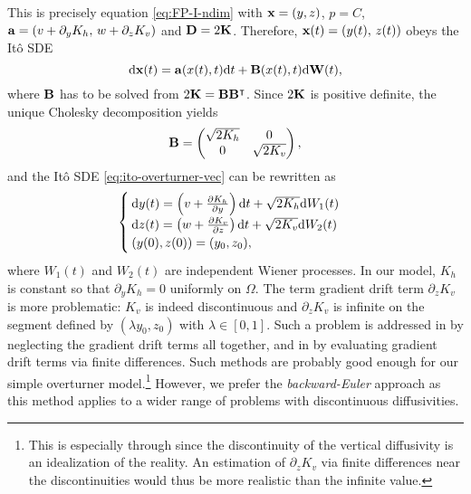 This is precisely equation \eqref{eq:FP-I-ndim} with $\b x =(y,z)$, $p=C$, $\b a = (v+\partial_y K_{h},\, w+\partial_z K_{v})$ and $\b D = 2\b K$. Therefore, $\b x(t) = (y(t),\, z(t))$ obeys the Itô SDE
\begin{equation} \label{eq:ito-overturner-vec}
	\rm d \b x(t) = \b a(x(t),t) \rm dt + \b B(x(t),t) \rm d \b W(t),
\end{equation}
where $\b B$ has to be solved from $2\b K = \b B \b B^{\t}$. Since $2\b K$ is positive definite, the unique Cholesky decomposition yields
\begin{equation} \label{eq:B}
	\b B = \begin{pmatrix} \sqrt{2K_{h}} & 0 \\ 0 & \sqrt{2K_{v}} \end{pmatrix},
\end{equation}
and the Itô SDE \eqref{eq:ito-overturner-vec} can be rewritten as
\begin{equation} \label{eq:ito-overturner}
	\begin{cases}
		\rm dy(t) = \left(v + \frac{\partial K_h}{\partial y} \right) \rm dt + \sqrt{2K_h}\rm dW_1(t)\\
		\rm dz(t) = \left(w + \frac{\partial K_v}{\partial z} \right) \rm dt + \sqrt{2K_v}\rm dW_2(t)\\
		(y(0),z(0)) = (y_0,z_0),
	\end{cases}
\end{equation}
where $W_1(t)$ and $W_2(t)$ are independent Wiener processes. In our model, $K_h$ is constant so that $\partial_y K_h = 0$ uniformly on $\Omega$. The term gradient drift term $\partial_z K_v$ is more problematic: $K_v$ is indeed discontinuous and $\partial_z K_v$ is infinite on the segment defined by $(\lambda y_0, z_0)$ with $\lambda \in [0,1]$. Such a problem is addressed in \cite{prickett1981random} by neglecting the gradient drift terms all together, and in \cite{tompson1987numerical} by evaluating gradient drift terms via finite differences. Such methods are probably good enough for our simple overturner model.\footnote{This is especially through since the discontinuity of the vertical diffusivity is an idealization of the reality. An estimation of $\partial_z K_v$ via finite differences near the discontinuities would thus be more realistic than the infinite value.} However, we prefer the \textit{backward-Euler} approach as this method applies to a wider range of problems with discontinuous diffusivities.

